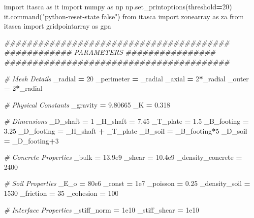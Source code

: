 \documentclass[a4paper, nobind]{templates/ociamthesis}
\newenvironment{Shaded}{\begin{snugshade}}{\end{snugshade}}
\newcommand{\CommentTok}[1]{\textcolor[rgb]{0.56,0.35,0.01}{\textit{#1}}}
\newcommand{\DecValTok}[1]{\textcolor[rgb]{0.00,0.00,0.81}{#1}}
\newcommand{\FloatTok}[1]{\textcolor[rgb]{0.00,0.00,0.81}{#1}}
\newcommand{\ImportTok}[1]{#1}
\newcommand{\NormalTok}[1]{#1}
\newcommand{\OperatorTok}[1]{\textcolor[rgb]{0.81,0.36,0.00}{\textbf{#1}}}
\newcommand{\StringTok}[1]{\textcolor[rgb]{0.31,0.60,0.02}{#1}}
\renewenvironment{Shaded}
{
  \vspace{10pt}%
  \begin{snugshade}%
}{%
  \end{snugshade}%
  \vspace{8pt}%
}
\begin{document}
\begin{Shaded}
\begin{Highlighting}[]
\ImportTok{import}\NormalTok{ itasca }\ImportTok{as}\NormalTok{ it}
\ImportTok{import}\NormalTok{ numpy }\ImportTok{as}\NormalTok{ np}
\NormalTok{np.set\_printoptions(threshold}\OperatorTok{=}\DecValTok{20}\NormalTok{)}
\NormalTok{it.command(}\StringTok{"python{-}reset{-}state false"}\NormalTok{)}
\ImportTok{from}\NormalTok{ itasca }\ImportTok{import}\NormalTok{ zonearray }\ImportTok{as}\NormalTok{ za}
\ImportTok{from}\NormalTok{ itasca }\ImportTok{import}\NormalTok{ gridpointarray }\ImportTok{as}\NormalTok{ gpa}

\CommentTok{\#\#\#\#\#\#\#\#\#\#\#\#\#\#\#\#\#\#\#\#\#\#\#\#\#\#\#\#\#\#\#\#\#\#\#\#\#\#\#\#}
\CommentTok{\#\#\#\#\#\#\#\#\#\#\#\# PARAMETERS \#\#\#\#\#\#\#\#\#\#\#\#\#\#\#\#}
\CommentTok{\#\#\#\#\#\#\#\#\#\#\#\#\#\#\#\#\#\#\#\#\#\#\#\#\#\#\#\#\#\#\#\#\#\#\#\#\#\#\#\#}

\CommentTok{\# Mesh Details}
\NormalTok{\_radial }\OperatorTok{=} \DecValTok{20}
\NormalTok{\_perimeter }\OperatorTok{=}\NormalTok{ \_radial}
\NormalTok{\_axial }\OperatorTok{=} \DecValTok{2}\OperatorTok{*}\NormalTok{\_radial}
\NormalTok{\_outer }\OperatorTok{=} \DecValTok{2}\OperatorTok{*}\NormalTok{\_radial}

\CommentTok{\# Physical Constants}
\NormalTok{\_gravity }\OperatorTok{=} \FloatTok{9.80665}
\NormalTok{\_K }\OperatorTok{=} \FloatTok{0.318}

\CommentTok{\# Dimensions}
\NormalTok{\_D\_shaft }\OperatorTok{=} \DecValTok{1}
\NormalTok{\_H\_shaft }\OperatorTok{=} \FloatTok{7.45}
\NormalTok{\_T\_plate }\OperatorTok{=} \FloatTok{1.5}
\NormalTok{\_B\_footing }\OperatorTok{=} \FloatTok{3.25}
\NormalTok{\_D\_footing }\OperatorTok{=}\NormalTok{ \_H\_shaft }\OperatorTok{+}\NormalTok{ \_T\_plate}
\NormalTok{\_B\_soil }\OperatorTok{=}\NormalTok{ \_B\_footing}\OperatorTok{*}\DecValTok{5}
\NormalTok{\_D\_soil }\OperatorTok{=}\NormalTok{ \_D\_footing}\OperatorTok{+}\DecValTok{3}

\CommentTok{\# Concrete Properties}
\NormalTok{\_bulk }\OperatorTok{=} \FloatTok{13.9e9}
\NormalTok{\_shear }\OperatorTok{=} \FloatTok{10.4e9}
\NormalTok{\_density\_concrete }\OperatorTok{=} \DecValTok{2400}

\CommentTok{\# Soil Properties}
\NormalTok{\_E\_o }\OperatorTok{=} \FloatTok{80e6}
\NormalTok{\_const }\OperatorTok{=} \FloatTok{1e7}
\NormalTok{\_poisson }\OperatorTok{=} \FloatTok{0.25}
\NormalTok{\_density\_soil }\OperatorTok{=} \DecValTok{1530}
\NormalTok{\_friction }\OperatorTok{=} \DecValTok{35}
\NormalTok{\_cohesion }\OperatorTok{=} \DecValTok{100}

\CommentTok{\# Interface Properties}
\NormalTok{\_stiff\_norm }\OperatorTok{=} \FloatTok{1e10}
\NormalTok{\_stiff\_shear }\OperatorTok{=} \FloatTok{1e10}
\end{Highlighting}
\end{Shaded}
\end{document}
